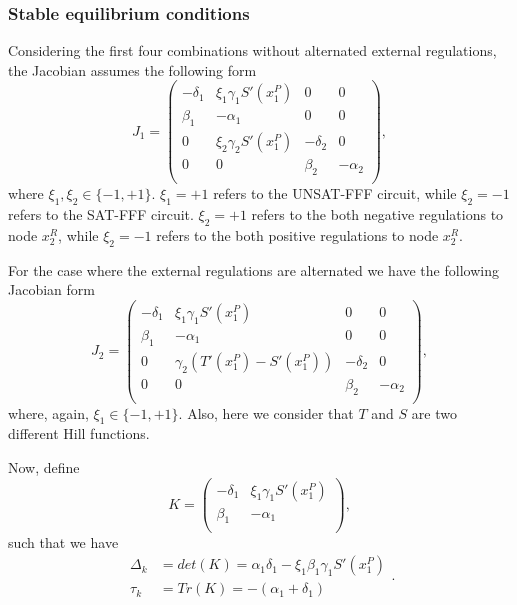 \subsubsection{Stable equilibrium conditions}

Considering the first four combinations without alternated external
regulations, the Jacobian assumes the following form 
\begin{equation}
    J_1 = 
    \begin{pmatrix}
        -\delta_1 & \xi_1\gamma_1S'(x_1^P) & 0 & 0 \\
        \beta_1 & -\alpha_1 & 0 & 0 \\
        0 & \xi_2\gamma_2 S'(x_1^P) & -\delta_2 & 0 \\
        0 & 0 & \beta_2 & -\alpha_2 \\
    \end{pmatrix},
\end{equation} 
where $\xi_1, \xi_2 \in \{ -1, +1 \}$. $\xi_1 = +1$ refers 
to the UNSAT-FFF circuit, while $\xi_2 = -1$ refers to the 
SAT-FFF circuit. $\xi_2 = +1$ refers to the both negative 
regulations to node $x_2^R$, while $\xi_2 = -1$ refers to 
the both positive regulations to node $x_2^R$.

For the case where the external regulations are alternated we 
have the following Jacobian form
\begin{equation}
    J_2 = 
    \begin{pmatrix}
        -\delta_1 & \xi_1\gamma_1S'(x_1^P) & 0 & 0 \\
        \beta_1 & -\alpha_1 & 0 & 0 \\
        0 & \gamma_2 (T'(x_1^P) - S'(x_1^P)) & -\delta_2 & 0 \\
        0 & 0 & \beta_2 & -\alpha_2 \\
    \end{pmatrix},
\end{equation} 
where, again, $\xi_1\in \{ -1, +1 \}$. Also, here we consider that 
$T$ and $S$ are two different Hill functions. 

Now, define
\begin{equation}
K = 
    \begin{pmatrix}
        -\delta_1 & \xi_1\gamma_1S'(x_1^P) \\
        \beta_1 & -\alpha_1 \\
    \end{pmatrix},
\end{equation} 
such that we have
\begin{equation}
    \begin{aligned}
        \Delta_k &= det(K) = \alpha_1 \delta_1 - \xi_1 \beta_1 \gamma_1 S'(x_1^P)\\
        \tau_k &= Tr(K) = -(\alpha_1 + \delta_1)
    \end{aligned}.
\end{equation}

